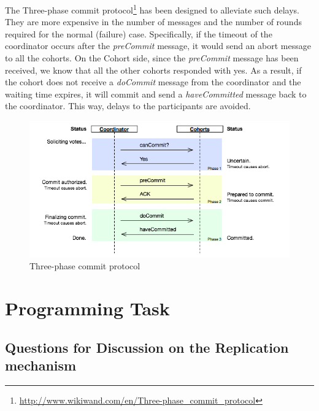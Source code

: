 \documentclass{article}      %
\begin{document}
The Three-phase commit protocol\footnote{\url{http://www.wikiwand.com/en/Three-phase_commit_protocol}} has been designed to alleviate such delays. They are more expensive in the number of messages and the number of rounds required for the normal (failure) case. Specifically, if the timeout of the coordinator occurs after the \emph{preCommit} message, it would send an abort message to all the cohorts. On the Cohort side, since the \emph{preCommit} message has been received, we know that all the other cohorts responded with yes. As a result, if the cohort does not receive a \emph{doCommit} message from the coordinator and the waiting time expires, it will commit and send a \emph{haveCommitted} message back to the coordinator. This way, delays to the participants are avoided.\\ 


\begin{figure}[ht]
\centering
 \includegraphics[scale=.5]{img/Three-phase_commit_diagram}
\caption{Three-phase commit protocol \label{overflow}}
\end{figure}

\section*{Programming Task}
\subsection*{Questions for Discussion on the Replication mechanism}
\end{document}
